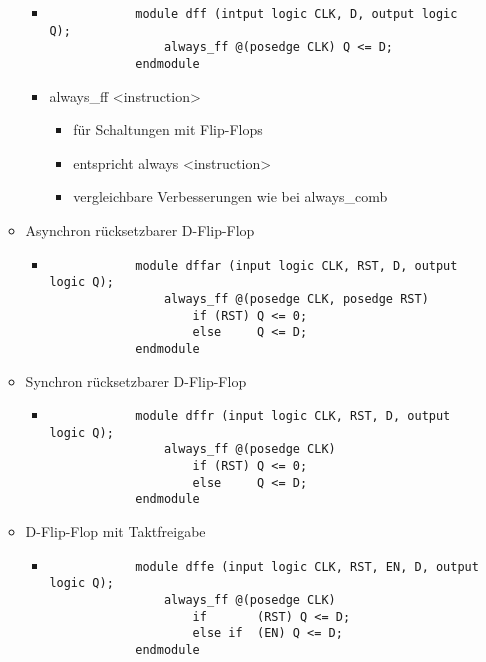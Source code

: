 \begin{itemize}
\begin{itemize}
\begin{itemize}
		\item[] 
			\begin{lstlisting}
			module dff (intput logic CLK, D, output logic Q);
				always_ff @(posedge CLK) Q <= D;
			endmodule
			\end{lstlisting}	
		
		\item always\_ff <instruction>
			\begin{itemize}
			\item für Schaltungen mit Flip-Flops
			\item entspricht always <instruction>
			\item vergleichbare Verbesserungen wie bei always\_comb
			\end{itemize}				
		
		\end{itemize}		
		
	\item Asynchron rücksetzbarer D-Flip-Flop
		\begin{itemize}
		\item[]
			\begin{lstlisting}
			module dffar (input logic CLK, RST, D, output logic Q);
				always_ff @(posedge CLK, posedge RST)
					if (RST) Q <= 0;
					else 	 Q <= D;
			endmodule
			\end{lstlisting}
		\end{itemize}		
		
	\item Synchron rücksetzbarer D-Flip-Flop
		\begin{itemize}
		\item[]
			\begin{lstlisting}
			module dffr (input logic CLK, RST, D, output logic Q);
				always_ff @(posedge CLK)
					if (RST) Q <= 0;
					else 	 Q <= D;
			endmodule
			\end{lstlisting}
		\end{itemize}			
	
	\item D-Flip-Flop mit Taktfreigabe
		\begin{itemize}
		\item[]
			\begin{lstlisting}
			module dffe (input logic CLK, RST, EN, D, output logic Q);
				always_ff @(posedge CLK)
					if		 (RST) Q <= D;
					else if  (EN) Q <= D;
			endmodule
			\end{lstlisting}
		\end{itemize}			
	

\end{itemize}
\end{itemize}
